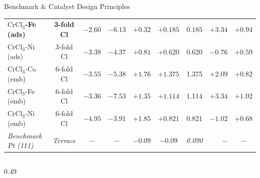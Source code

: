\documentclass[aspectratio=169]{beamer}
\begin{document}
\begin{frame}{Benchmark \& Catalyst Design Principles}
\begin{table}[htbp]
\begin{tabular}{lccccccrc}
      \textbf{$\text{CrCl}_3$-Fe (ads)} & \textbf{3-fold Cl} & $-2.60$                                                          & $-6.13$                                                                & $+0.32$                          & $\mathbf{+0.185}$              & $\mathbf{0.185}$                       & $+3.34$            & $+0.94$ \\
      $\text{CrCl}_3$-Ni (ads)          & 3-fold Cl          & $-3.38$                                                          & $-4.37$                                                                & $+0.81$                          & $+0.620$                       & 0.620                                  & $-0.76$            & $+0.59$ \\
      \midrule
      $\text{CrCl}_3$-Co (emb)          & 6-fold Cl          & $-3.55$                                                          & $-5.38$                                                                & $+1.76$                          & $+1.375$                       & 1.375                                  & $+2.09$            & $+0.82$ \\
      $\text{CrCl}_3$-Fe (emb)          & 6-fold Cl          & $-3.36$                                                          & $-7.53$                                                                & $+1.35$                          & $+1.114$                       & 1.114                                  & $+3.34$            & $+1.02$ \\
      $\text{CrCl}_3$-Ni (emb)          & 6-fold Cl          & $-4.95$                                                          & $-3.91$                                                                & $+1.85$                          & $+0.821$                       & 0.821                                  & $-1.02$            & $+0.68$ \\
      \midrule
      \textit{Benchmark Pt (111)}       & \textit{Terrace}   & $-$                                                              & $-$                                                                    & \textit{$-0.09$}                 & \textit{$-0.09$}               & \textit{0.090}                         & $-$                & $-$     \\
      \bottomrule
    \end{tabular}
  \end{table}
  \vspace{-0.3em}
  \begin{columns}[T]
    \begin{column}{0.49\textwidth}

\end{column}
\end{columns}
\end{frame}
\end{document}
